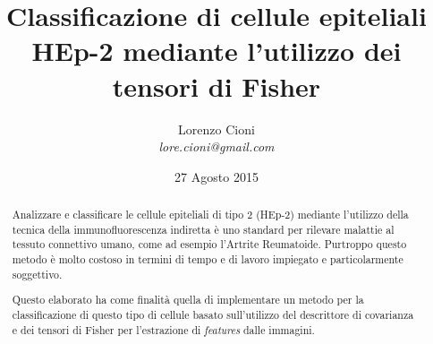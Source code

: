 \documentclass[a4paper,12pt]{article}
\title{\bf Classificazione di cellule epiteliali HEp-2 mediante l'utilizzo dei tensori di Fisher}
\date {27 Agosto 2015}
\author{Lorenzo Cioni\\\textit{{\small lore.cioni@gmail.com}}}
\begin{document}
\maketitle

\begin{abstract}

Analizzare e classificare le cellule epiteliali di tipo 2 (HEp-2) mediante l'utilizzo della tecnica della immunofluorescenza indiretta è uno standard per rilevare malattie al tessuto connettivo umano, come ad esempio l'Artrite Reumatoide. Purtroppo questo metodo è molto costoso in termini di tempo e di lavoro impiegato e particolarmente soggettivo.

Questo elaborato ha come finalità quella di implementare un metodo per la classificazione di questo tipo di cellule basato sull'utilizzo del descrittore di covarianza e dei tensori di Fisher per l'estrazione di \emph{features} dalle immagini.
\end{abstract}

\tableofcontents









\end{document}
